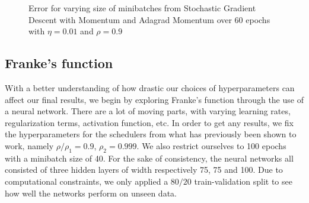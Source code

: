 \documentclass{article}
\theoremstyle{definition}
\begin{document}
\begin{figure}[H]%
    \centering
    \qquad
    \caption{Error for varying size of minibatches from Stochastic Gradient Descent with Momentum and Adagrad Momentum over 60 epochs with $\eta = 0.01$ and $\rho = 0.9$}%
    \label{fig:SGDadagradmomentum}%
\end{figure}

\newpage
\subsection{Franke's function}
With a better understanding of how drastic our choices of hyperparameters can affect our final results, we begin by exploring Franke's function through the use of a neural network. There are a lot of moving parts, with varying learning rates, regularization terms, activation function, etc. In order to get any results, we fix the hyperparameters for the schedulers from what has previously been shown to work, namely $\rho/\rho_1 = 0.9$, $\rho_2 = 0.999$. We also restrict ourselves to 100 epochs with a minibatch size of 40. For the sake of consistency, the neural networks all consisted of three hidden layers of width respectively 75, 75 and 100. Due to computational constraints, we only applied a $80 / 20$ train-validation split to see how well the networks perform on unseen data.
\end{document}
